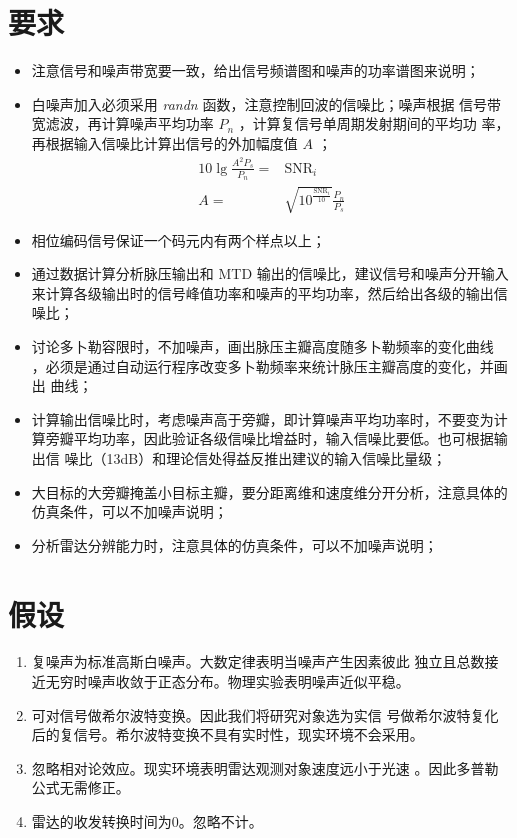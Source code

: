 \documentclass[../main]{subfiles}
\begin{document}
\section{要求}%
\label{sec:requirement}

\begin{itemize}
  \item 注意信号和噪声带宽要一致，给出信号频谱图和噪声的功率谱图来说明；
  \item 白噪声加入必须采用 \emph{randn} 函数，注意控制回波的信噪比；噪声根据
    信号带宽滤波，再计算噪声平均功率 $P_n$ ，计算复信号单周期发射期间的平均功
    率，再根据输入信噪比计算出信号的外加幅度值 $A$ ；
    \begin{align}
      10\lg \frac{A^2P_s}{P_n} = & \mathrm{SNR}_i\\
      \label{eq:a}
      A = & \sqrt{10^{\frac{\mathrm{SNR}_i}{10}}}\frac{P_n}{P_s}
    \end{align}
  \item 相位编码信号保证一个码元内有两个样点以上；
  \item 通过数据计算分析脉压输出和 MTD 输出的信噪比，建议信号和噪声分开输入
    来计算各级输出时的信号峰值功率和噪声的平均功率，然后给出各级的输出信噪比；
  \item 讨论多卜勒容限时，不加噪声，画出脉压主瓣高度随多卜勒频率的变化曲线
    ，必须是通过自动运行程序改变多卜勒频率来统计脉压主瓣高度的变化，并画出
    曲线；
  \item  计算输出信噪比时，考虑噪声高于旁瓣，即计算噪声平均功率时，不要变为计
    算旁瓣平均功率，因此验证各级信噪比增益时，输入信噪比要低。也可根据输出信
    噪比（13dB）和理论信处得益反推出建议的输入信噪比量级；
  \item 大目标的大旁瓣掩盖小目标主瓣，要分距离维和速度维分开分析，注意具体的
    仿真条件，可以不加噪声说明；
  \item 分析雷达分辨能力时，注意具体的仿真条件，可以不加噪声说明；
\end{itemize}

\section{假设}%
\label{sec:assumption}

\begin{enumerate}
  \item\label{it:noise}复噪声为标准高斯白噪声。大数定律表明当噪声产生因素彼此
    独立且总数接近无穷时噪声收敛于正态分布。物理实验表明噪声近似平稳。
  \item\label{it:hillbert}可对信号做希尔波特变换。因此我们将研究对象选为实信
    号做希尔波特复化后的复信号。希尔波特变换不具有实时性，现实环境不会采用。
  \item\label{it:doppler}忽略相对论效应。现实环境表明雷达观测对象速度远小于光速
    。因此多普勒公式无需修正。
  \item\label{it:time_switch}雷达的收发转换时间为0。忽略不计。
\end{enumerate}
\end{document}
